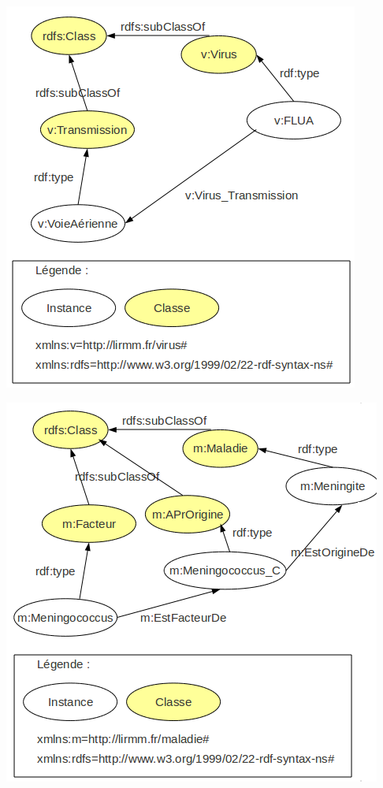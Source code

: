 \documentclass[12pt]{article}
\begin{document}
\begin{center}
	\includegraphics[scale=0.60]{images/rdf-virusTransmission.png}
\end{center}

\begin{center}
	\includegraphics[scale=0.60]{images/rdf-MaladieFacteur.png}
\end{center}
\end{document}
